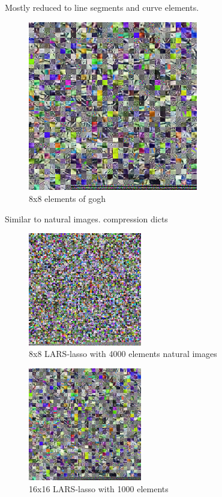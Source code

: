 Mostly reduced to line segments and curve elements.

\begin{figure}[h]
\centering
\includegraphics[width = 0.66\textwidth]{images/16_1000_1000_10_lasso.png}
\caption{8x8 elements of gogh}
\label{fig:16_1000_lasso}
\end{figure}

Similar to natural images.
compression dicts

\begin{figure}[h]
\centering
\includegraphics[width = 0.44\textwidth]{images/8_4000_10000_10_lasso.png} 
\caption{8x8 LARS-lasso with 4000 elements natural images}
\label{fig:8_4000_lasso}
\end{figure}


\begin{figure}[h]
\centering
\includegraphics[width = 0.44\textwidth]{images/16_1000_1000_10_lasso.png}
\caption{16x16 LARS-lasso with 1000 elements}
\label{fig:16_1000_lasso}
\end{figure}

